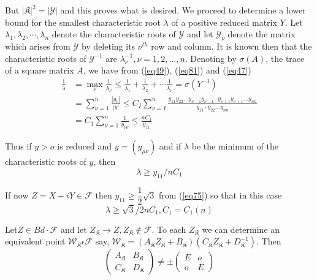 But $|\mathfrak{K}|^2 = | \mathcal{Y}|$ and this proves what is
desired. We proceed to determine a lower bound for the smallest
characteristic root $\lambda$ of a positive reduced matrix
$Y$. Let $\lambda_1, \lambda_2, \cdots, \lambda_n$ denote the
characteristic roots of $\mathcal{Y}$ and let $\mathcal{Y}_\nu$ denote
the matrix which arises from $\mathcal{Y}$ by deleting its $\nu^{th}$
row and column. It is known then that the characteristic roots of
$\mathcal{Y}^{-1}$ are $\lambda^{-1}_\nu, \nu =1, 2, \ldots ,n$.
Denoting by $\sigma (A)$, the trace of a square matrix $A$, we have
from (\ref{eq49}), (\ref{eq81}) and (\ref{eq47}) 
\begin{align*}
\frac{1}{\lambda} & =\max_\nu \frac{1}{\lambda_\nu} \leq
\frac{1}{\lambda_1} + \frac{1}{\lambda_2} + \cdots
\frac{1}{\lambda_\nu}= \sigma (Y^{-1})\\ 
& =\sum^n_{\nu =1} \frac{|y_\nu |}{|y|} \leq C_I
\sum^n_{\nu = I}\frac{y_{11}y_{22}\ldots
  y_{\nu-1}y_{\nu-1} \cdot y_{\nu+1} y_{\nu+1} \ldots y_{nn}}{y_{11}
  \cdot y_{22} \ldots y_{nn}}\\ 
 & =C_1 \sum^n_{\nu =1} \frac{1}{y_{\nu \nu }}\leq \frac{n
  C_1}{y_{11}} \tag{82}\label{eq82}    
\end{align*}

Thus if $y > o$ is reduced and $ y = (y_{\mu
  \nu})$ and if $\lambda$ be the minimum of the characteristic roots
of $y$, then 
\begin{equation*}
\lambda \geq y_{11}/n C_1 \tag{82}\label{addeq82}   
\end{equation*}

If now $Z = X + i Y \in \mathcal{F}$ then $y_{11} \geq
\dfrac{1}{2}\sqrt{3}$ from (\ref{eq75}) so that in this case 
\begin{equation*}
\lambda \ge \sqrt{3}/ 2n C_1, C_1 = C_1(n)\tag{83}\label{eq83}   
\end{equation*}

Let\pageoriginale $Z \in Bd \cdot  \mathcal{F}$ and let $Z_\mathfrak{K} \to
Z,Z_\mathfrak{K} \notin \mathcal{F}$. To each $Z_\mathfrak{K}$ we can
determine an equivalent point $\mathcal{W}_\mathfrak{K} \epsilon
\mathcal{F}$ say, $\mathcal{W}_\mathfrak{K} = (A_\mathfrak{K}
Z_\mathfrak{K}+B_\mathfrak{K})(C_\mathfrak{K}
Z_\mathfrak{K}+D^{-1}_\mathfrak{K})$. Then   
\begin{equation*}
\begin{pmatrix}
A_\mathfrak{K} &  B_\mathfrak{K}\\ C_\mathfrak{K} & D_\mathfrak{K}
\end{pmatrix}
\neq \pm 
\begin{pmatrix}
E & o \\ o & E
\end{pmatrix}
\end{equation*}

